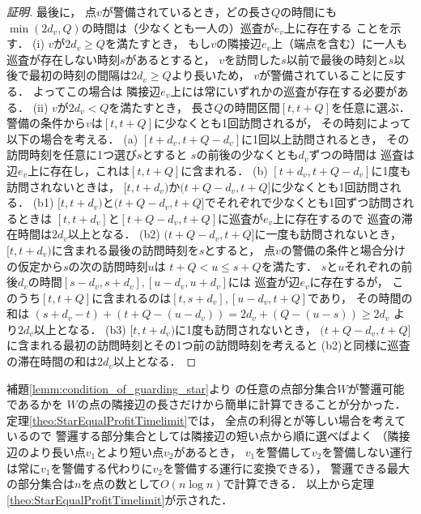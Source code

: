 \begin{proof}[証明]
  最後に，
  点$v$が警備されているとき，どの長さ$Q$の時間にも
  $\min(2d_v, Q)$の時間は（少なくとも一人の）巡査が$e_v$上に存在する
  ことを示す．
  (i) $v$が$2d_v \geq Q$を満たすとき，
    もし$v$の隣接辺$e_v$上（端点を含む）に一人も巡査が存在しない時刻$s$があるとすると，
    $v$を訪問した$s$以前で最後の時刻と$s$以後で最初の時刻の間隔は$2d_v \geq Q$より長いため，
    $v$が警備されていることに反する．
    よってこの場合は
    隣接辺$e_v$上には常にいずれかの巡査が存在する必要がある．
  (ii) $v$が$2d_v < Q$を満たすとき，
    長さ$Q$の時間区間$[t, t + Q]$を任意に選ぶ．
    警備の条件から$v$は$[t, t + Q]$に少なくとも1回訪問されるが，
    その時刻によって以下の場合を考える．
    (a) $[t + d_v, t + Q - d_v]$に1回以上訪問されるとき，
      その訪問時刻を任意に1つ選び$s$とすると
      $s$の前後の少なくとも$d_v$ずつの時間は
      巡査は辺$e_v$上に存在し，これは$[t, t + Q]$に含まれる．
    (b) $[t + d_v, t + Q - d_v]$に1度も訪問されないときは，
      $[t, t + d_v)$か$(t + Q - d_v, t + Q]$に少なくとも1回訪問される．
      (b1) $[t, t + d_v)$と$(t + Q - d_v, t + Q]$でそれぞれで少なくとも1回ずつ訪問されるときは
        $[t, t + d_v]$と$[t + Q - d_v, t + Q]$に巡査が$e_v$上に存在するので
        巡査の滞在時間は$2d_v$以上となる．
      (b2) $(t + Q - d_v, t + Q]$に一度も訪問されないとき，
        $[t, t + d_v)$に含まれる最後の訪問時刻を$s$とすると，
        点$v$の警備の条件と場合分けの仮定から$s$の次の訪問時刻$u$は
        $t + Q < u \leq s + Q$を満たす．
        $s$と$u$それぞれの前後$d_v$の時間$[s - d_v, s + d_v], [u - d_v, u + d_v]$には
        巡査が辺$e_v$に存在するが，
        このうち$[t, t + Q]$に含まれるのは$[t, s + d_v], [u - d_v, t + Q]$であり，
        その時間の和は
        $(s + d_v - t) + (t + Q - (u - d_v)) = 2d_v + (Q - (u - s)) \geq 2d_v$
        より$2d_v$以上となる．
      (b3) $[t, t + d_v)$に1度も訪問されないとき，
        $(t + Q - d_v, t + Q]$に含まれる最初の訪問時刻とその1つ前の訪問時刻を考えると
        (b2)と同様に巡査の滞在時間の和は$2d_v$以上となる．

\end{proof}



補題\ref{lemm:condition_of_guarding_star}より
{\graphStar}の任意の点部分集合$W$が警邏可能であるかを
$W$の点の隣接辺の長さだけから簡単に計算できることが分かった．
定理\ref{theo:StarEqualProfitTimelimit}では，
全点の利得と{\idletime}が等しい場合を考えているので
警邏する部分集合としては隣接辺の短い点から順に選べばよく
（隣接辺のより長い点$v_1$とより短い点$v_2$があるとき，
$v_1$を警備して$v_2$を警備しない運行は常に$v_1$を警備する代わりに$v_2$を警備する運行に変換できる），
警邏できる最大の部分集合は$n$を点の数として$O(n \log n)$で計算できる．
以上から定理\ref{theo:StarEqualProfitTimelimit}が示された．
